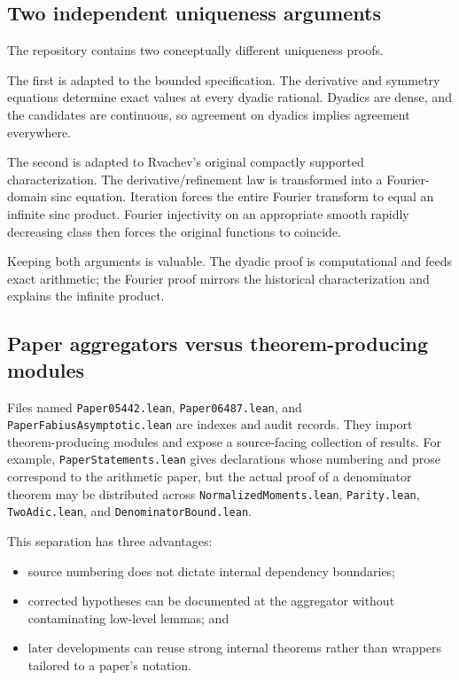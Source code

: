 \documentclass[11pt,oneside]{article}
\theoremstyle{definition}
\theoremstyle{remark}
\begin{document}
\subsection{Two independent uniqueness arguments}
The repository contains two conceptually different uniqueness proofs.

The first is adapted to the bounded specification.  The derivative and symmetry equations determine exact values at every dyadic rational.  Dyadics are dense, and the candidates are continuous, so agreement on dyadics implies agreement everywhere.

The second is adapted to Rvachev's original compactly supported characterization.  The derivative/refinement law is transformed into a Fourier-domain sinc equation.  Iteration forces the entire Fourier transform to equal an infinite sinc product.  Fourier injectivity on an appropriate smooth rapidly decreasing class then forces the original functions to coincide.

Keeping both arguments is valuable.  The dyadic proof is computational and feeds exact arithmetic; the Fourier proof mirrors the historical characterization and explains the infinite product.

\subsection{Paper aggregators versus theorem-producing modules}
Files named \nolinkurl{Paper05442.lean}, \nolinkurl{Paper06487.lean}, and \nolinkurl{PaperFabiusAsymptotic.lean} are indexes and audit records.  They import theorem-producing modules and expose a source-facing collection of results.  For example, \nolinkurl{PaperStatements.lean} gives declarations whose numbering and prose correspond to the arithmetic paper, but the actual proof of a denominator theorem may be distributed across \nolinkurl{NormalizedMoments.lean}, \nolinkurl{Parity.lean}, \nolinkurl{TwoAdic.lean}, and \nolinkurl{DenominatorBound.lean}.

This separation has three advantages:
\begin{itemize}
  \item source numbering does not dictate internal dependency boundaries;
  \item corrected hypotheses can be documented at the aggregator without contaminating low-level lemmas; and
  \item later developments can reuse strong internal theorems rather than wrappers tailored to a paper's notation.
\end{itemize}
\end{document}
